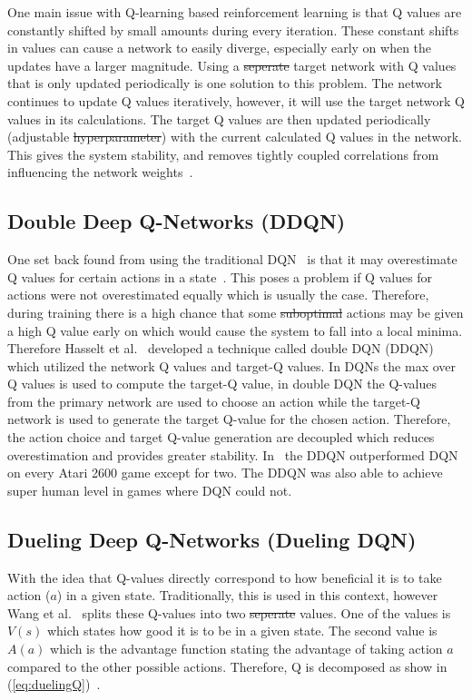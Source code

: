 \documentclass[12pt,american]{report}
\providecommand{\DIFaddtex}[1]{{\protect\color{blue}\uwave{#1}}} %
\providecommand{\DIFdeltex}[1]{{\protect\color{red}\sout{#1}}}                      %
\providecommand{\DIFaddbegin}{} %
\providecommand{\DIFaddend}{} %
\providecommand{\DIFdelbegin}{} %
\providecommand{\DIFdelend}{} %
\providecommand{\DIFadd}[1]{\texorpdfstring{\DIFaddtex{#1}}{#1}} %
\providecommand{\DIFdel}[1]{\texorpdfstring{\DIFdeltex{#1}}{}} %
\newcommand{\DIFscaledelfig}{0.5}
\newlength{\DIFdelgraphicswidth} %
\newlength{\DIFdelgraphicsheight} %
\newcommand{\DIFaddincludegraphics}[2][]{{\color{blue}\fbox{\DIFOincludegraphics[#1]{#2}}}} %
\newcommand{\DIFdelincludegraphics}[2][]{%
\sbox{\DIFdelgraphicsbox}{\DIFOincludegraphics[#1]{#2}}%
\settoboxwidth{\DIFdelgraphicswidth}{\DIFdelgraphicsbox} %
\settoboxtotalheight{\DIFdelgraphicsheight}{\DIFdelgraphicsbox} %
\scalebox{\DIFscaledelfig}{%
\parbox[b]{\DIFdelgraphicswidth}{\usebox{\DIFdelgraphicsbox}\\[-\baselineskip] \rule{\DIFdelgraphicswidth}{0em}}\llap{\resizebox{\DIFdelgraphicswidth}{\DIFdelgraphicsheight}{%
\setlength{\unitlength}{\DIFdelgraphicswidth}%
\begin{picture}(1,1)%
\thicklines\linethickness{2pt} %
{\color[rgb]{1,0,0}\put(0,0){\framebox(1,1){}}}%
{\color[rgb]{1,0,0}\put(0,0){\line( 1,1){1}}}%
{\color[rgb]{1,0,0}\put(0,1){\line(1,-1){1}}}%
\end{picture}%
}\hspace*{3pt}}} %
} %
\DeclareRobustCommand{\DIFaddbegin}{\DIFOaddbegin \let\includegraphics\DIFaddincludegraphics} %
\DeclareRobustCommand{\DIFaddend}{\DIFOaddend \let\includegraphics\DIFOincludegraphics} %
\DeclareRobustCommand{\DIFdelbegin}{\DIFOdelbegin \let\includegraphics\DIFdelincludegraphics} %
\DeclareRobustCommand{\DIFdelend}{\DIFOaddend \let\includegraphics\DIFOincludegraphics} %
\begin{document}
One main issue with Q-learning based reinforcement learning is that Q values are constantly shifted by small amounts during every iteration.  These constant shifts in values can cause a network to easily diverge, especially early on when the updates have a larger magnitude.  Using a \DIFdelbegin \DIFdel{seperate }\DIFdelend \DIFaddbegin \DIFadd{separate }\DIFaddend target network with Q values that is only updated periodically is one solution to this problem.  The network continues to update Q values iteratively, however, it will use the target network Q values in its calculations.  The target Q values are then updated periodically (adjustable \DIFdelbegin \DIFdel{hyperparameter}\DIFdelend \DIFaddbegin \DIFadd{hyper-parameter}\DIFaddend ) with the current calculated Q values in the network.  This gives the system stability, and removes tightly coupled correlations from influencing the network weights~\cite{atari}.


\subsection{Double Deep Q-Networks (DDQN)}

One set back found from using the traditional DQN~\cite{atari} is that it may overestimate Q values for certain actions in a state~\cite{van2016deep}. This poses a problem if Q values for actions were not overestimated equally which is usually the case.  Therefore, during training there is a high chance that some \DIFdelbegin \DIFdel{suboptimal }\DIFdelend \DIFaddbegin \DIFadd{sub-optimal }\DIFaddend actions may be given a high Q value early on which would cause the system to fall into a local minima.  Therefore Hasselt et al.~\cite{van2016deep} developed a technique called double DQN (DDQN) which utilized the network Q values and target-Q values.  In DQNs the max over Q values is used to compute the target-Q value, in double DQN the Q-values from the primary network are used to choose an action while the target-Q network is used to generate the target Q-value for the chosen action. Therefore, the action choice and target Q-value generation are decoupled which reduces overestimation and provides greater stability.  In~\cite{van2016deep}  the DDQN outperformed DQN on every Atari 2600 game except for two. The DDQN was also able to achieve super human level in games where DQN could not. 

\subsection{Dueling Deep Q-Networks (Dueling DQN)}
\DIFaddbegin \label{sec:DuelingDQN}
\DIFaddend With the idea that Q-values directly correspond to how beneficial it is to take action ($a$) in a given state. Traditionally, this is used in this context, however Wang et al.~\cite{wang2015dueling} splits these Q-values into two \DIFdelbegin \DIFdel{seperate }\DIFdelend \DIFaddbegin \DIFadd{separate }\DIFaddend values.  One of the values is $V(s)$ which states how good it is to be in a given state. The second value is $A(a)$ which is the advantage function stating the advantage of taking action $a$ compared to the other possible actions.  Therefore, Q is decomposed as show in (\ref{eq:duelingQ})~\cite{wang2015dueling}.
\end{document}
